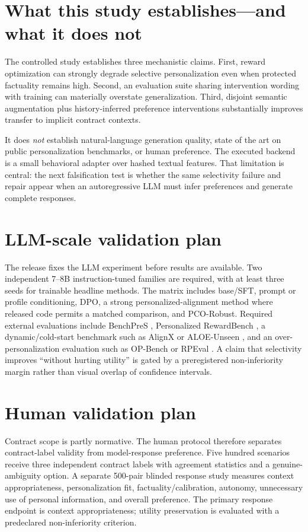 \documentclass[10pt]{article}
\newcommand{\method}{PCO-Robust}
\begin{document}
\section{What this study establishes---and what it does not}
The controlled study establishes three mechanistic claims. First, reward optimization can strongly degrade selective personalization even when protected factuality remains high. Second, an evaluation suite sharing intervention wording with training can materially overstate generalization. Third, disjoint semantic augmentation plus history-inferred preference interventions substantially improves transfer to implicit contract contexts.

It does \emph{not} establish natural-language generation quality, state of the art on public personalization benchmarks, or human preference. The executed backend is a small behavioral adapter over hashed textual features. That limitation is central: the next falsification test is whether the same selectivity failure and repair appear when an autoregressive LLM must infer preferences and generate complete responses.

\section{LLM-scale validation plan}
The release fixes the LLM experiment before results are available. Two independent 7--8B instruction-tuned families are required, with at least three seeds for trainable headline methods. The matrix includes base/SFT, prompt or profile conditioning, DPO, a strong personalized-alignment method where released code permits a matched comparison, and \method{}. Required external evaluations include BenchPreS \citep{benchpres}, Personalized RewardBench \citep{rewardbench}, a dynamic/cold-start benchmark such as AlignX or ALOE-Unseen \citep{alignx,personalagent}, and an over-personalization evaluation such as OP-Bench or RPEval \citep{opbench,rpeval}. A claim that selectivity improves ``without hurting utility'' is gated by a preregistered non-inferiority margin rather than visual overlap of confidence intervals.

\section{Human validation plan}
Contract scope is partly normative. The human protocol therefore separates contract-label validity from model-response preference. Five hundred scenarios receive three independent contract labels with agreement statistics and a genuine-ambiguity option. A separate 500-pair blinded response study measures context appropriateness, personalization fit, factuality/calibration, autonomy, unnecessary use of personal information, and overall preference. The primary response endpoint is context appropriateness; utility preservation is evaluated with a predeclared non-inferiority criterion.
\end{document}
